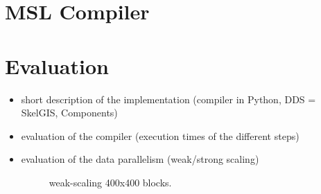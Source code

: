 \documentclass[twocolumn]{svjour3}          %
\begin{document}
\section{MSL Compiler}
\label{sect:comp}

\section{Evaluation}
\label{sect:eval}
\begin{itemize}
\item short description of the implementation (compiler in Python, DDS = SkelGIS, Components)
\item evaluation of the compiler (execution times of the different steps)
\item evaluation of the data parallelism (weak/strong scaling)

\begin{figure}[!h]\begin{center}
  \caption{weak-scaling 400x400 blocks.}
  \label{fig:mesh}
\end{center}\end{figure}


\end{itemize}
\end{document}
